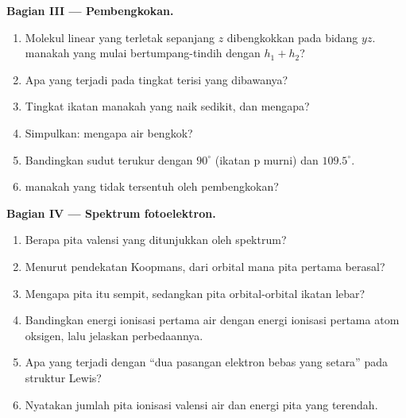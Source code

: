 \begin{problem}
\medskip
\noindent\textbf{Bagian III --- Pembengkokan.}
\begin{enumerate}[resume]
  \item Molekul linear yang terletak sepanjang $z$ dibengkokkan pada bidang
        $yz$.  manakah yang mulai bertumpang-tindih dengan
        $h_1 + h_2$?
  \item Apa yang terjadi pada tingkat terisi yang dibawanya?
  \item Tingkat ikatan manakah yang naik sedikit, dan mengapa?
  \item Simpulkan: mengapa air bengkok?
  \item Bandingkan sudut terukur dengan $90^\circ$ (ikatan p murni) dan
        $109.5^\circ$.
  \item {} manakah yang tidak tersentuh oleh pembengkokan?
\end{enumerate}

\medskip
\noindent\textbf{Bagian IV --- Spektrum fotoelektron.}
\begin{enumerate}[resume]
  \item Berapa pita valensi yang ditunjukkan oleh spektrum?
  \item Menurut pendekatan Koopmans, dari orbital mana pita pertama berasal?
  \item Mengapa pita itu sempit, sedangkan pita orbital-orbital ikatan
        lebar?
  \item Bandingkan energi ionisasi pertama air dengan energi ionisasi
        pertama atom oksigen, lalu jelaskan perbedaannya.
  \item Apa yang terjadi dengan ``dua pasangan elektron bebas yang setara''
        pada struktur Lewis?
  \item Nyatakan jumlah pita ionisasi valensi air dan energi pita yang
        terendah.
\end{enumerate}
\end{problem}
